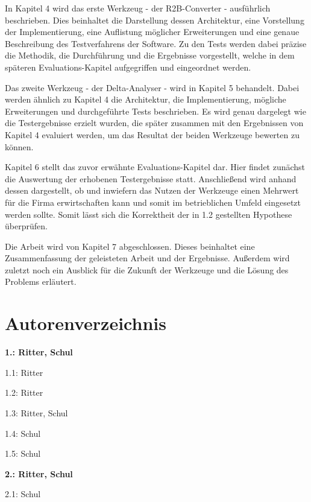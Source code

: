 \documentclass[12pt]{report}
\begin{document}
In Kapitel 4 wird das erste Werkzeug - der R2B-Converter - ausführlich beschrieben. Dies beinhaltet die Darstellung dessen Architektur, eine Vorstellung der Implementierung, eine Auflistung möglicher Erweiterungen und eine genaue Beschreibung des Testverfahrens der Software. Zu den Tests werden dabei präzise die Methodik, die Durchführung und die Ergebnisse vorgestellt, welche in dem späteren Evaluations-Kapitel aufgegriffen und eingeordnet werden. 

Das zweite Werkzeug - der Delta-Analyser - wird in Kapitel 5 behandelt. Dabei werden ähnlich zu Kapitel 4 die Architektur, die Implementierung, mögliche Erweiterungen und durchgeführte Tests beschrieben. Es wird genau dargelegt wie die Testergebnisse erzielt wurden, die später zusammen mit den Ergebnissen von Kapitel 4 evaluiert werden, um das Resultat der beiden Werkzeuge bewerten zu können. 

Kapitel 6 stellt das zuvor erwähnte Evaluations-Kapitel dar. Hier findet zunächst die Auswertung der erhobenen Testergebnisse statt.
Anschließend wird anhand dessen dargestellt, ob und inwiefern das Nutzen der Werkzeuge einen Mehrwert für die Firma erwirtschaften kann und somit im betrieblichen Umfeld eingesetzt werden sollte.  
Somit lässt sich die Korrektheit der in 1.2 gestellten Hypothese überprüfen.

Die Arbeit wird von Kapitel 7 abgeschlossen. Dieses beinhaltet eine Zusammenfassung der geleisteten Arbeit und der Ergebnisse. Außerdem wird zuletzt noch ein Ausblick für die Zukunft der Werkzeuge und die Lösung des Problems erläutert. 

\section{Autorenverzeichnis}
\begin{multicols}{2}
\begin{compactitem}
\item[] \textbf{1.: Ritter, Schul}

\begin{compactitem}
\item[] 1.1: Ritter
\item[] 1.2: Ritter
\item[] 1.3: Ritter, Schul
\item[] 1.4: Schul
\item[] 1.5: Schul
\end{compactitem}

\item[] \textbf{2.: Ritter, Schul}
\begin{compactitem}
\item[] 2.1: Schul
\end{compactitem}

\end{compactitem}
\end{multicols}
\end{document}
